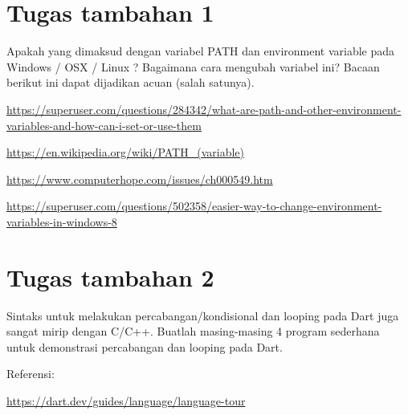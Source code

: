 \documentclass[a4paper,11pt]{article} %
\begin{document}
\section{Tugas tambahan 1}

Apakah yang dimaksud dengan variabel PATH dan environment variable
pada Windows / OSX / Linux ?
Bagaimana cara mengubah variabel ini?
Bacaan berikut ini dapat dijadikan acuan (salah satunya).

{\footnotesize
\url{https://superuser.com/questions/284342/what-are-path-and-other-environment-variables-and-how-can-i-set-or-use-them}

\url{https://en.wikipedia.org/wiki/PATH_(variable)}

\url{https://www.computerhope.com/issues/ch000549.htm}

\url{https://superuser.com/questions/502358/easier-way-to-change-environment-variables-in-windows-8}
}


\section{Tugas tambahan 2}

Sintaks untuk melakukan percabangan/kondisional dan looping pada Dart juga sangat mirip
dengan C/C++. Buatlah masing-masing 4 program sederhana untuk demonstrasi
percabangan dan looping pada Dart.

Referensi:

{\footnotesize
\url{https://dart.dev/guides/language/language-tour}
}







\end{document}
